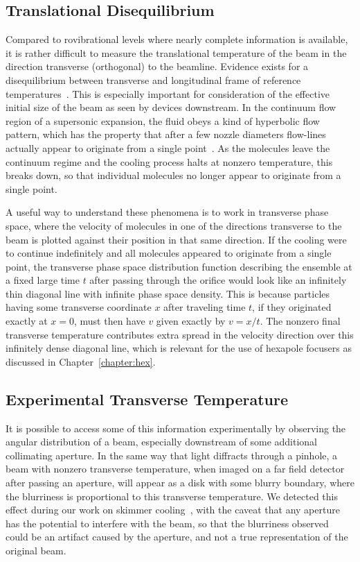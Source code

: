 \subsection{Translational Disequilibrium}

Compared to rovibrational levels where nearly complete information is available, it is rather difficult to measure the translational temperature of the beam in the direction transverse (orthogonal) to the beamline. 
Evidence exists for a disequilibrium between transverse and longitudinal frame of reference temperatures~\cite{beijerinck1981,Toennies1977,Miller1988}.
This is especially important for consideration of the effective initial size of the beam as seen by devices downstream.
In the continuum flow region of a supersonic expansion, the fluid obeys a kind of hyperbolic flow pattern, which has the property that after a few nozzle diameters flow-lines actually appear to originate from a single point~\cite{Miller1988}.
As the molecules leave the continuum regime and the cooling process halts at nonzero temperature, this breaks down, so that individual molecules no longer appear to originate from a single point.

A useful way to understand these phenomena is to work in transverse phase space, where the velocity of molecules in one of the directions transverse to the beam is plotted against their position in that same direction.
If the cooling were to continue indefinitely and all molecules appeared to originate from a single point, the transverse phase space distribution function describing the ensemble at a fixed large time $t$ after passing through the orifice would look like an infinitely thin diagonal line with infinite phase space density. 
This is because particles having some transverse coordinate $x$ after traveling time $t$, if they originated exactly at $x=0$, must then have $v$ given exactly by $v = x/t$.
The nonzero final transverse temperature contributes extra spread in the velocity direction over this infinitely dense diagonal line, which is relevant for the use of hexapole focusers as discussed in Chapter~\ref{chapter:hex}.

\subsection{Experimental Transverse Temperature}

It is possible to access some of this information experimentally by observing the angular distribution of a beam, especially downstream of some additional collimating aperture.
In the same way that light diffracts through a pinhole, a beam with nonzero transverse temperature, when imaged on a far field detector after passing an aperture, will appear as a disk with some blurry boundary, where the blurriness is proportional to this transverse temperature.
We detected this effect during our work on skimmer cooling~\cite{Wu2018}, with the caveat that any aperture has the potential to interfere with the beam, so that the blurriness observed could be an artifact caused by the aperture, and not a true representation of the original beam.




